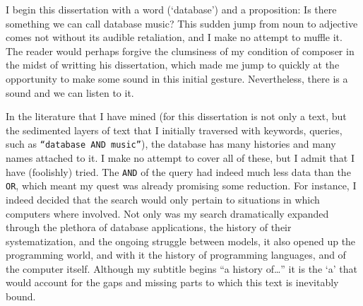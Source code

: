 I begin this dissertation with a word (`database') and a proposition: Is there something we can call database music? This sudden jump from noun to adjective comes not without its audible retaliation, and I make no attempt to muffle it. The reader would perhaps forgive the clumsiness of my condition of composer in the midst of writting his dissertation, which made me jump to quickly at the opportunity to make some sound in this initial gesture. Nevertheless, there is a sound and we can listen to it.

In the literature that I have mined (for this dissertation is not only a text, but the sedimented layers of text that I initially traversed with keywords, queries, such as \texttt{``database AND music''}), the database has many histories and many names attached to it. I make no attempt to cover all of these, but I admit that I have (foolishly) tried. The \texttt{AND} of the query had indeed much less data than the \texttt{OR}, which meant my quest was already promising some reduction. For instance, I indeed decided that the search would only pertain to situations in which computers where involved. Not only was my search dramatically expanded through the plethora of database applications, the history of their systematization, and the ongoing struggle between models, it also opened up the programming world, and with it the history of programming languages, and of the computer itself. Although my subtitle begins ``a history of\dots'' it is the `a' that would account for the gaps and missing parts to which this text is inevitably bound. 








































